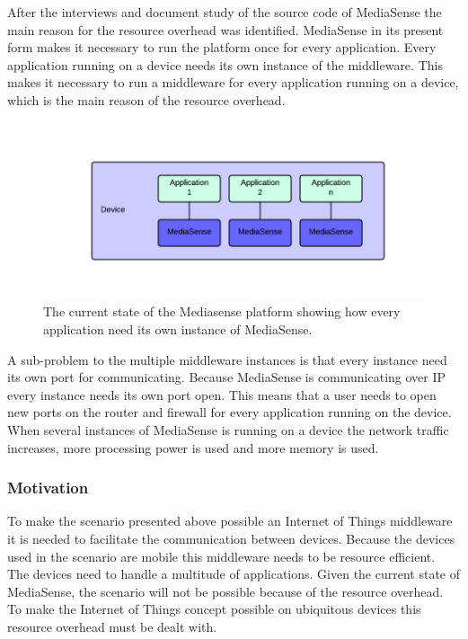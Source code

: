 After the interviews and document study of the source code of MediaSense the main reason for the resource overhead was identified. MediaSense in its present form makes it necessary to run the platform once for every application. Every application running on a device needs its own instance of the middleware. This makes it necessary to run a middleware for every application running on a device, which is the main reason of the resource overhead. 

\begin{figure}[h!]
		\centering
    	\includegraphics[scale=0.30]{part_4/result_and_analysis/MediasenseArchOld.png}
		\caption{The current state of the Mediasense platform showing how every application need its own instance of MediaSense.} 
\end{figure}

A sub-problem to the multiple middleware instances is that every instance need its own port for communicating. Because MediaSense is communicating over IP every instance needs its own port open. This means that a user needs to open new ports on the router and firewall for every application running on the device. When several instances of MediaSense is running on a device the network traffic increases, more processing power is used and more memory is used. 

\subsubsection{Motivation}
To make the scenario presented above possible an Internet of Things middleware it is needed to facilitate the communication between devices. Because the devices used in the scenario are mobile this middleware needs to be resource efficient. The devices need to handle a multitude of applications. Given the current state of MediaSense, the scenario will not be possible because of the resource overhead. To make the Internet of Things concept possible on ubiquitous devices this resource overhead must be dealt with.

